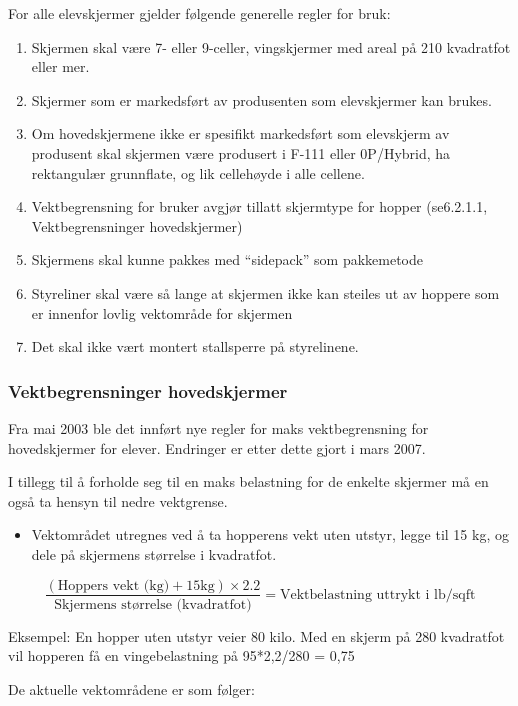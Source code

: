 For alle elevskjermer gjelder følgende generelle regler for bruk:
\begin{enumerate}
	\item Skjermen skal være 7- eller 9-celler, vingskjermer med areal på 210 kvadratfot eller mer.
	\item Skjermer som er markedsført av produsenten som elevskjermer kan brukes.
	\item Om hovedskjermene ikke er spesifikt markedsført som elevskjerm av produsent skal skjermen være produsert i F-111 eller 0P/Hybrid, ha rektangulær grunnflate, og lik cellehøyde i alle cellene.
	\item Vektbegrensning for bruker avgjør tillatt skjermtype for hopper (se6.2.1.1, Vektbegrensninger hovedskjermer)
	\item Skjermens skal kunne pakkes med ``sidepack'' som pakkemetode
	\item Styreliner skal være så lange at skjermen ikke kan steiles ut av hoppere som er innenfor lovlig vektområde for skjermen
	\item Det skal ikke vært montert stallsperre på styrelinene.
\end{enumerate}

\subsubsection{Vektbegrensninger hovedskjermer}
Fra mai 2003 ble det innført nye regler for maks vektbegrensning for hovedskjermer for elever. Endringer er etter dette gjort i mars 2007.

I tillegg til å forholde seg til en maks belastning for de enkelte skjermer må en også ta hensyn til nedre vektgrense.

\begin{itemize}
	\item Vektområdet utregnes ved å ta hopperens vekt uten utstyr, legge til 15 kg, og dele på skjermens størrelse i kvadratfot.
\end{itemize}

\begin{displaymath}
	\frac{(\text{Hoppers vekt (kg)} + 15 \mathrm{kg}) \times 2.2}{\text{Skjermens størrelse (kvadratfot)}} = \text{Vektbelastning uttrykt i lb/sqft}
\end{displaymath}

Eksempel: En hopper uten utstyr veier 80 kilo. Med en skjerm på 280 kvadratfot vil hopperen få en vingebelastning på 95*2,2/280 = 0,75

De aktuelle vektområdene er som følger:

